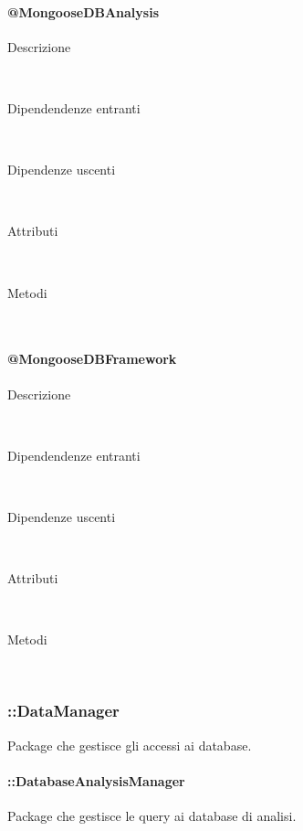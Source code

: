 \paragraph{@MongooseDBAnalysis}
\begin{description}
 \item[Descrizione] \hfill \\

 \item[Dipendendenze entranti] \hfill \\
 
 \item[Dipendenze uscenti] \hfill \\
 
 \item[Attributi] \hfill \\
 
 \item[Metodi] \hfill \\
\end{description}

\paragraph{@MongooseDBFramework}
\begin{description}
 \item[Descrizione] \hfill \\

 \item[Dipendendenze entranti] \hfill \\
 
 \item[Dipendenze uscenti] \hfill \\
 
 \item[Attributi] \hfill \\
 
 \item[Metodi] \hfill \\
\end{description}

\subsubsection{::DataManager}
Package che gestisce gli accessi ai database.

\paragraph{::DatabaseAnalysisManager}
Package che gestisce le query ai database di analisi. 

